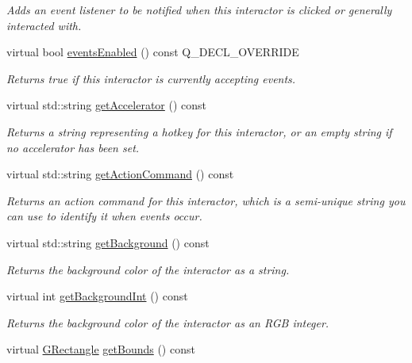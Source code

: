 \begin{DoxyCompactItemize}
\begin{DoxyCompactList}\small\item\em Adds an event listener to be notified when this interactor is clicked or generally interacted with. \end{DoxyCompactList}\item 
virtual bool \mbox{\hyperlink{classGInteractor_ac05ba5b92e2e5146d416fe7f842a0969}{events\+Enabled}} () const Q\+\_\+\+D\+E\+C\+L\+\_\+\+O\+V\+E\+R\+R\+I\+DE
\begin{DoxyCompactList}\small\item\em Returns true if this interactor is currently accepting events. \end{DoxyCompactList}\item 
virtual std\+::string \mbox{\hyperlink{classGInteractor_a69f8d23ed8f207fbecad99960776e942}{get\+Accelerator}} () const
\begin{DoxyCompactList}\small\item\em Returns a string representing a hotkey for this interactor, or an empty string if no accelerator has been set. \end{DoxyCompactList}\item 
virtual std\+::string \mbox{\hyperlink{classGInteractor_a94eb4276000c4fdfb508ce9e6317a82a}{get\+Action\+Command}} () const
\begin{DoxyCompactList}\small\item\em Returns an action command for this interactor, which is a semi-\/unique string you can use to identify it when events occur. \end{DoxyCompactList}\item 
virtual std\+::string \mbox{\hyperlink{classGInteractor_a808e22cc1fdfbecf71ed8c64ef4600e0}{get\+Background}} () const
\begin{DoxyCompactList}\small\item\em Returns the background color of the interactor as a string. \end{DoxyCompactList}\item 
virtual int \mbox{\hyperlink{classGInteractor_a9e827257a55cb8cf4d9de2ec6bcfd7a0}{get\+Background\+Int}} () const
\begin{DoxyCompactList}\small\item\em Returns the background color of the interactor as an R\+GB integer. \end{DoxyCompactList}\item 
virtual \mbox{\hyperlink{classGRectangle}{G\+Rectangle}} \mbox{\hyperlink{classGInteractor_a29e6ac35a0b48f491a4c88194cc5da3b}{get\+Bounds}} () const

\end{DoxyCompactItemize}
